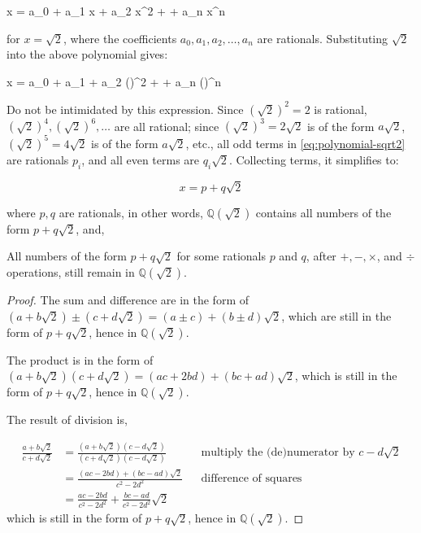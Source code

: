 \be
x = a_0 + a_1 x + a_2 x^2 + \dotsb + a_n x^n
\ee

for $x = \sqrt{2}$, where the coefficients $a_0, a_1, a_2, \dotsc, a_n$ are rationals. Substituting $\sqrt{2}$ into the above polynomial gives:

\be
x = a_0 + a_1  + a_2 ()^2 + \dotsb + a_n ()^n
\label{eq:polynomial-sqrt2}
\ee

Do not be intimidated by this expression. Since $(\sqrt{2})^2 = 2$ is rational, $(\sqrt{2})^4, (\sqrt{2})^6, \dotsc$ are all rational; since $(\sqrt{2})^3 = 2\sqrt{2}$ is of the form $a\sqrt{2}$, $(\sqrt{2})^5 = 4\sqrt{2}$ is of the form $a\sqrt{2}$, etc., all odd terms in \cref{eq:polynomial-sqrt2} are rationals $p_i$, and all even terms are $q_i \sqrt{2}$. Collecting terms, it simplifies to:

\[
x = p + q\sqrt{2}
\]

where $p, q$ are rationals, in other words, $\mathbb{Q}(\sqrt{2})$ contains all numbers of the form $p + q\sqrt{2}$, and,

\begin{proposition}
All numbers of the form $p + q\sqrt{2}$ for some rationals $p$ and $q$, after $+, -, \times$, and $\div$ operations, still remain in $\mathbb{Q}(\sqrt{2})$.
\end{proposition}

\begin{proof}
The sum and difference are in the form of $(a + b\sqrt{2}) \pm (c + d\sqrt{2}) = (a \pm c) + (b \pm d)\sqrt{2}$, which are still in the form of $p + q\sqrt{2}$, hence in $\mathbb{Q}(\sqrt{2})$.

The product is in the form of $(a + b\sqrt{2})(c + d\sqrt{2}) = (ac + 2bd) + (bc + ad)\sqrt{2}$, which is still in the form of $p + q\sqrt{2}$, hence in $\mathbb{Q}(\sqrt{2})$.

The result of division is,

\begin{align*}
\frac{a + b\sqrt{2}}{c + d\sqrt{2}} &= \frac{(a + b\sqrt{2})(c - d\sqrt{2})}{(c + d\sqrt{2})(c - d\sqrt{2})} &&\text{multiply the (de)numerator by }c - d\sqrt{2} \\
&= \frac{(ac - 2bd) + (bc - ad)\sqrt{2}}{c^2 - 2d^2} &&\text{difference of squares} \\
&= \frac{ac - 2bd}{c^2 - 2d^2} + \frac{bc - ad}{c^2 - 2d^2}\sqrt{2}
\end{align*}
which is still in the form of $p + q\sqrt{2}$, hence in $\mathbb{Q}(\sqrt{2})$.
\end{proof}

